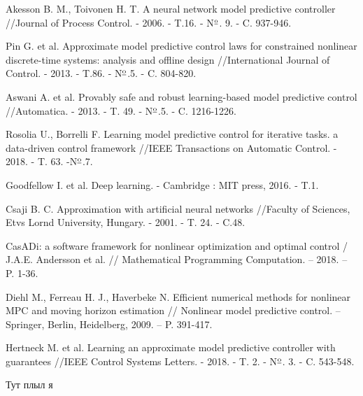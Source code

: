 \begin{biblio}
Akesson B. M., Toivonen H. T. A neural network model predictive controller //Journal of Process Control. - 2006. - T.16. - N$\textsuperscript{\underline{o}}$. 9. - C. 937-946.

Pin G. et al. Approximate model predictive control laws for constrained nonlinear discrete-time systems: analysis and offline design //International Journal of Control. - 2013. - T.86. - N$\textsuperscript{\underline{o}}$.5. - C. 804-820.

Aswani A. et al. Provably safe and robust learning-based model predictive control //Automatica. - 2013. - T. 49. - N$\textsuperscript{\underline{o}}$.5. - C. 1216-1226.

Rosolia U., Borrelli F. Learning model predictive control for iterative tasks. a data-driven control framework //IEEE Transactions on Automatic Control. - 2018. - T. 63. -N$\textsuperscript{\underline{o}}$.7.

Goodfellow I. et al. Deep learning. - Cambridge : MIT press, 2016. - T.1.

Csaji B. C. Approximation with artificial neural networks //Faculty of Sciences, Etvs Lornd University, Hungary. - 2001. - T. 24. - C.48.

CasADi: a software framework for nonlinear optimization and optimal control / J.A.E. Andersson  et al. // Mathematical Programming Computation. -- 2018. -- P. 1-36.

Diehl M., Ferreau H. J., Haverbeke N. Efficient numerical methods for nonlinear MPC and moving horizon estimation // Nonlinear model predictive control. -- Springer, Berlin, Heidelberg, 2009. -- P. 391-417.

Hertneck M. et al. Learning an approximate model predictive controller with guarantees //IEEE Control Systems Letters. - 2018. - T. 2. - N$\textsuperscript{\underline{o}}$. 3. - C. 543-548.

Тут плыл я

\end{biblio} 